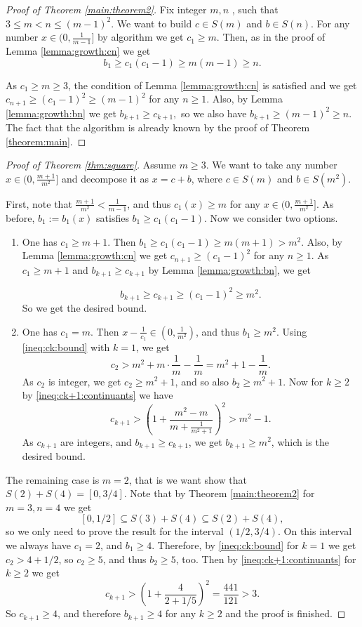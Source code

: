 \documentclass{amsart}
\theoremstyle{definition}
\newcommand{\0}{\mbf 0}%
\begin{document}
\begin{proof}[Proof of Theorem \ref{main:theorem2}]

Fix integer $m,n$ , such that 
$3 \leq m < n\leq (m-1)^2$. We want to build $c\in S(m)$ and $b\in S(n)$. For any number $x\in (0,\frac{1}{m-1}]$ by algorithm we get $c_1\geq m$. Then, as in the proof of Lemma \ref{lemma:growth:cn} we get 
$$b_1 \geq c_1(c_1-1) \geq m(m-1)\geq n.$$

As $c_1\geq m \geq3$, the condition of Lemma \ref{lemma:growth:cn} is satisfied and we get $c_{n+1}\geq (c_1-1)^2 \geq (m-1)^2$ for any $n\geq1$. Also, by Lemma \ref{lemma:growth:bn} we get $b_{k+1}\geq c_{k+1},$ so we also have $b_{k+1}\geq (m-1)^2\geq n$. The fact that the algorithm is already known by the proof of Theorem \ref{theorem:main}.
\end{proof}

\begin{proof}[Proof of Theorem \ref{thm:square}]
   Assume $m\geq3$. We want to take any number $x\in(0,\frac{m+1}{m^2}]$ and decompose it as $x=c+b$, where $c\in S(m)$ and $b\in S(m^2)$.

    First, note that $\frac{m+1}{m^2} < \frac{1}{m-1}$, and thus $c_1(x)\geq m$ for any $x\in(0,\frac{m+1}{m^2}]$. As before, $b_1:=b_1(x)$ satisfies $b_1\geq c_1(c_1-1)$. Now we consider two options.

    \begin{enumerate}
        \item One has $c_1\geq m+1$. Then $b_1\geq c_1(c_1-1)\geq m(m+1)> m^2$.
        Also, by Lemma \ref{lemma:growth:cn} we get $c_{n+1}\geq(c_1-1)^2$ for any $n\geq1$. As $c_1\geq m+1$ and $b_{k+1}\geq c_{k+1}$ by Lemma \ref{lemma:growth:bn}, we get
        
$$
b_{k+1}\geq c_{k+1} \geq (c_1-1)^2 \geq m^2.
$$    
So we get the desired bound.

        \item One has $c_1=m$. Then $x-\frac{1}{c_1} \in \left(0,\frac{1}{m^2}\right)$, and thus $b_1\geq m^2$. Using \eqref{ineq:ck:bound} with $k=1$, we get
        $$
c_{2} > m^2 + m \cdot \frac{1}{m} - \frac{1}{m}=m^2+1-\frac{1}{m}.
$$
As $c_2$ is integer, we get $c_2\geq m^2+1$, and so also $b_2\geq m^2+1$. Now for $k\geq2$ by \eqref{ineq:ck+1:continuants} we have
$$
c_{k+1} > \left(1 + \frac{m^2-m }{m +  \frac{1}{m^2+1}} \right)^2 > m^2-1.
$$
As $c_{k+1}$ are integers, and $b_{k+1}\geq c_{k+1}$, we get $b_{k+1}\geq m^2$, which is the desired bound.
    \end{enumerate}

    The remaining case is $m=2$, that is we want show that $S(2)+S(4)=[0,3/4]$. Note that by Theorem \ref{main:theorem2} for $m=3,n=4$ we get
    $$
    [0,1/2]\subseteq S(3)+S(4)\subseteq S(2)+S(4), $$
    so we only need to prove the result for the interval $(1/2,3/4)$. On this interval we always have $c_1=2$, and $b_1\geq 4$. Therefore, by \eqref{ineq:ck:bound} for $k=1$ we get $c_2>4+1/2$, so $c_2\geq 5$, and thus $b_2\geq5$, too. Then by \eqref{ineq:ck+1:continuants} for $k\geq2$ we get
$$
c_{k+1} > \left(1+\frac{4}{2+1/5} \right)^2 = \frac{441}{121}>3.
$$
So $c_{k+1}\geq4$, and therefore $b_{k+1}\geq4$ for any $k\geq2$ and the proof is finished.
\end{proof}
\end{document}
